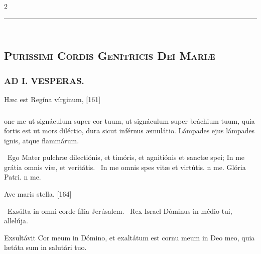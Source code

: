 \documentclass[9pt,twoside]{extarticle}
\begin{document}
\begin{multicols}{2}
\begin{center}\textcolor{red}{\rule{\linewidth}{0.5pt}} \end{center}

\subsection*{\center \textsc{\\
Purissimi Cordis Genitricis Dei Mariæ}}
\subsubsection*{\center {}}

\subsubsection*{\center \textsc{AD I. VESPERAS.}}
\begin{tightlist}{}
\item {} Hæc est Regína vírginum,  [161]
\end{tightlist}
\subsubsection*{}
one me ut signáculum super cor tuum, ut signáculum super bráchium tuum, quia fortis est ut mors diléctio, dura sicut inférnus æmulátio. Lámpades ejus lámpades ignis, atque flammárum.

\begin{tightlist}{}
\item {}~Ego Mater pulchræ dilectiónis, et timóris, et agnitiónis et sanctæ spei; \textred{*} In me grátia omnis viæ, et veritátis. ~In me omnis spes vitæ et virtútis. n me. Glória Patri. n me.
\item {} Ave maris stella. [164]
\item {}~Exsúlta in omni corde fília Jerúsalem. ~Rex Israel Dóminus in médio tui, allelúja.
\item {} Exsultávit Cor meum in Dómino, et exaltátum est cornu meum in Deo meo, quia lætáta sum in salutári tuo.
\end{tightlist}


\end{multicols}
\end{document}
